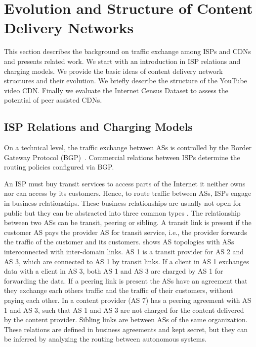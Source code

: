\section{Evolution and Structure of Content Delivery Networks}\label{sec:aslevel:background}

This section describes the background on traffic exchange among ISPs and CDNs and presents related work.
We start with an introduction in ISP relations and charging models.
We provide the basic ideas of content delivery network structures and their evolution.
We briefly describe the structure of the YouTube video CDN.
Finally we evaluate the Internet Census Dataset to assess the potential of peer assisted CDNs.

\subsection{ISP Relations and Charging Models}

On a technical level, the traffic exchange between ASs is controlled by the Border Gateway Protocol (BGP)~\cite{trangia2009}. Commercial relations between ISPs determine the routing policies configured via BGP.

An ISP must buy transit services to access parts of the Internet it neither owns nor can access by its customers.
Hence, to route traffic between ASs, ISPs engage in business relationships.
These business relationships are usually not open for public but they can be abstracted into three common types \cite{gao2001}.
The relationship between two ASs can be transit, peering or sibling.
A transit link is present if the customer AS pays the provider AS for transit service, i.e., the provider forwards the traffic of the customer and its customers.
 shows AS topologies with ASs interconnected with inter-domain links.
AS 1 is a transit provider for AS 2 and AS 3, which are connected to AS 1 by transit links.
If a client in AS 1 exchanges data with a client in AS 3, both AS 1 and AS 3 are charged by AS 1 for forwarding the data.
If a peering link is present the ASs have an agreement that they exchange each others traffic and the traffic of their customers, without paying each other.
In  a content provider (AS 7) has a peering agreement with AS 1 and AS 3, such that AS 1 and AS 3 are not charged for the content delivered by the content provider.
Sibling links are between ASs of the same organization. These relations are defined in business agreements and kept secret, but they can be inferred by analyzing the routing between autonomous systems.

